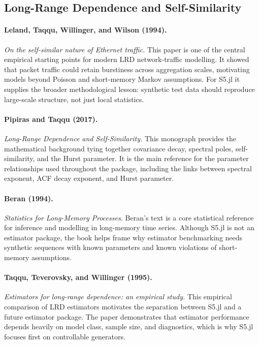 \subsection{Long-Range Dependence and Self-Similarity}

\paragraph{Leland, Taqqu, Willinger, and Wilson (1994).}
\emph{On the self-similar nature of Ethernet traffic.}
This paper is one of the central empirical starting points for modern LRD
network-traffic modelling. It showed that packet traffic could retain burstiness
across aggregation scales, motivating models beyond Poisson and short-memory
Markov assumptions. For S5.jl it supplies the broader methodological lesson:
synthetic test data should reproduce large-scale structure, not just local
statistics.

\paragraph{Pipiras and Taqqu (2017).}
\emph{Long-Range Dependence and Self-Similarity.}
This monograph provides the mathematical background tying together covariance
decay, spectral poles, self-similarity, and the Hurst parameter. It is the main
reference for the parameter relationships used throughout the package, including
the links between spectral exponent, ACF decay exponent, and Hurst parameter.

\paragraph{Beran (1994).}
\emph{Statistics for Long-Memory Processes.}
Beran's text is a core statistical reference for inference and modelling in
long-memory time series. Although S5.jl is not an estimator package, the book
helps frame why estimator benchmarking needs synthetic sequences with known
parameters and known violations of short-memory assumptions.

\paragraph{Taqqu, Teverovsky, and Willinger (1995).}
\emph{Estimators for long-range dependence: an empirical study.}
This empirical comparison of LRD estimators motivates the separation between
S5.jl and a future estimator package. The paper demonstrates that estimator
performance depends heavily on model class, sample size, and diagnostics, which
is why S5.jl focuses first on controllable generators.

